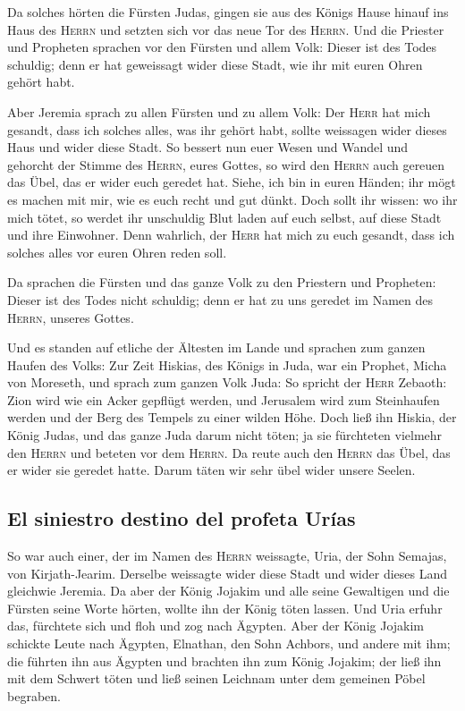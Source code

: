  Da solches hörten die Fürsten Judas, gingen sie aus des
Königs Hause hinauf ins Haus des \textsc{Herrn} und setzten sich vor das
neue Tor des \textsc{Herrn}.  Und die Priester und
Propheten sprachen vor den Fürsten und allem Volk: Dieser ist des Todes
schuldig; denn er hat geweissagt wider diese Stadt, wie ihr mit euren
Ohren gehört habt.

 Aber Jeremia sprach zu allen Fürsten und zu allem Volk:
Der \textsc{Herr} hat mich gesandt, dass ich solches alles, was ihr
gehört habt, sollte weissagen wider dieses Haus und wider diese Stadt.
 So bessert nun euer Wesen und Wandel und gehorcht der
Stimme des \textsc{Herrn}, eures Gottes, so wird den \textsc{Herrn} auch
gereuen das Übel, das er wider euch geredet hat.  Siehe,
ich bin in euren Händen; ihr mögt es machen mit mir, wie es euch recht
und gut dünkt.  Doch sollt ihr wissen: wo ihr mich tötet,
so werdet ihr unschuldig Blut laden auf euch selbst, auf diese Stadt und
ihre Einwohner. Denn wahrlich, der \textsc{Herr} hat mich zu euch
gesandt, dass ich solches alles vor euren Ohren reden soll.

 Da sprachen die Fürsten und das ganze Volk zu den
Priestern und Propheten: Dieser ist des Todes nicht schuldig; denn er
hat zu uns geredet im Namen des \textsc{Herrn}, unseres Gottes.

 Und es standen auf etliche der Ältesten im Lande und
sprachen zum ganzen Haufen des Volks:  Zur Zeit Hiskias,
des Königs in Juda, war ein Prophet, Micha von Moreseth, und sprach zum
ganzen Volk Juda: So spricht der \textsc{Herr} Zebaoth: Zion wird wie
ein Acker gepflügt werden, und Jerusalem wird zum Steinhaufen werden und
der Berg des Tempels zu einer wilden Höhe.  Doch ließ ihn
Hiskia, der König Judas, und das ganze Juda darum nicht töten; ja sie
fürchteten vielmehr den \textsc{Herrn} und beteten vor dem
\textsc{Herrn}. Da reute auch den \textsc{Herrn} das Übel, das er wider
sie geredet hatte. Darum täten wir sehr übel wider unsere Seelen.

\hypertarget{el-siniestro-destino-del-profeta-uruxedas}{%
\subsection{El siniestro destino del profeta
Urías}\label{el-siniestro-destino-del-profeta-uruxedas}}

 So war auch einer, der im Namen des \textsc{Herrn}
weissagte, Uria, der Sohn Semajas, von Kirjath-Jearim. Derselbe
weissagte wider diese Stadt und wider dieses Land gleichwie Jeremia.
 Da aber der König Jojakim und alle seine Gewaltigen und
die Fürsten seine Worte hörten, wollte ihn der König töten lassen. Und
Uria erfuhr das, fürchtete sich und floh und zog nach Ägypten.
 Aber der König Jojakim schickte Leute nach Ägypten,
Elnathan, den Sohn Achbors, und andere mit ihm;  die
führten ihn aus Ägypten und brachten ihn zum König Jojakim; der ließ ihn
mit dem Schwert töten und ließ seinen Leichnam unter dem gemeinen Pöbel
begraben.

